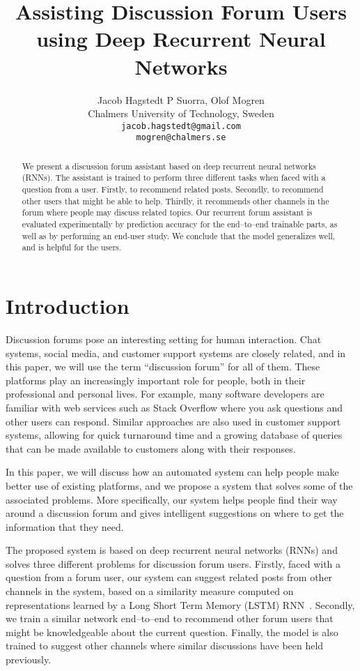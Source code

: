 \documentclass[11pt]{article}
\title{Assisting Discussion Forum Users using Deep Recurrent Neural Networks}
\author{Jacob Hagstedt P Suorra, Olof Mogren \vspace{1.2em} \\ 
  Chalmers University of Technology,
  Sweden \vspace{.4em} \\
  {\tt jacob.hagstedt@gmail.com} \\
  {\tt mogren@chalmers.se} \\}
\date{}
\newenvironment{reasonable}{\par\color{blue}}{\par}
\newenvironment{reasonable}{\par\color{black}}{\par}
\begin{document}
\maketitle
\begin{abstract}
  \begin{reasonable}
We present a discussion forum assistant based on deep recurrent  neural networks (RNNs).
The assistant is trained to perform three different tasks when faced with a question from a user.
Firstly, to recommend related posts.
Secondly, to recommend other users that might be able to help.
Thirdly, it recommends other channels in the forum where people may discuss related topics.
Our recurrent forum assistant is evaluated experimentally by prediction accuracy for the end--to--end trainable parts, as well as by performing an end-user study.
We conclude that the model generalizes well, and is helpful for the users.
  \end{reasonable}
\end{abstract}

\section{Introduction}

Discussion forums pose an interesting setting for human interaction.
Chat systems, social media, and customer support systems are closely related, and in this paper, we will use the term ``discussion forum'' for all of them.
These platforms play an increasingly important role for people, both in their professional and personal lives.
For example, many software developers are familiar with web services such as Stack Overflow where you ask questions and other users can respond.
Similar approaches are also used in customer support systems, allowing for quick turnaround time and a growing database of queries that can be made available to customers along with their responses.

In this paper, we will discuss how an automated system can help people make better use of existing platforms, and we propose a system that solves some of the associated problems. More specifically, our system helps people find their way around a discussion forum and gives intelligent suggestions on where to get the information that they need.

The proposed system is based on deep recurrent neural networks (RNNs) and solves three different problems for discussion forum users.
Firstly, faced with a question from a forum user, our system can suggest related posts from other channels in the system, based on a similarity measure computed on representations learned by a Long Short Term Memory (LSTM) RNN~\cite{schmidhuber1997long}.
Secondly, we train a similar network end--to--end to recommend other forum users that might be knowledgeable about the current question.
Finally, the model is also trained to suggest other channels where similar discussions have been held previously.
\end{document}
